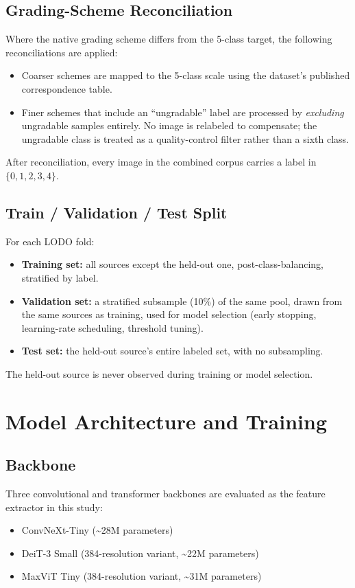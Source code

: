 \documentclass[11pt]{article}
\begin{document}
\subsection{Grading-Scheme Reconciliation}
Where the native grading scheme differs from the 5-class target, the following reconciliations are applied:
\begin{itemize}[leftmargin=*, topsep=0pt]
  \item Coarser schemes are mapped to the 5-class scale using the dataset's published correspondence table.
  \item Finer schemes that include an ``ungradable'' label are processed by \emph{excluding} ungradable samples entirely. No image is relabeled to compensate; the ungradable class is treated as a quality-control filter rather than a sixth class.
\end{itemize}

After reconciliation, every image in the combined corpus carries a label in $\{0, 1, 2, 3, 4\}$.

\subsection{Train / Validation / Test Split}
For each LODO fold:
\begin{itemize}[leftmargin=*, topsep=0pt]
  \item \textbf{Training set:} all sources except the held-out one, post-class-balancing, stratified by label.
  \item \textbf{Validation set:} a stratified subsample (10\%) of the same pool, drawn from the same sources as training, used for model selection (early stopping, learning-rate scheduling, threshold tuning).
  \item \textbf{Test set:} the held-out source's entire labeled set, with no subsampling.
\end{itemize}

The held-out source is never observed during training or model selection.

\section{Model Architecture and Training}

\subsection{Backbone}
\label{sec:backbone}

Three convolutional and transformer backbones are evaluated as the feature extractor in this study:
\begin{itemize}[leftmargin=*, topsep=0pt]
  \item ConvNeXt-Tiny (\textasciitilde{}28M parameters)
  \item DeiT-3 Small (384-resolution variant, \textasciitilde{}22M parameters)
  \item MaxViT Tiny (384-resolution variant, \textasciitilde{}31M parameters)
\end{itemize}
\end{document}
